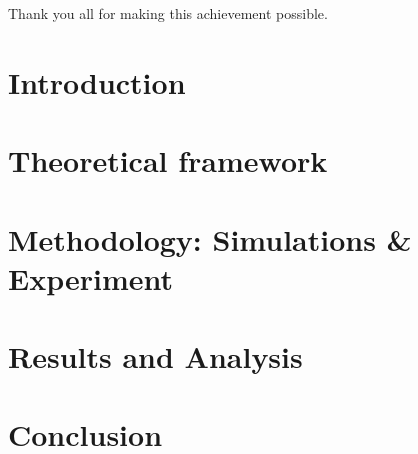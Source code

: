 \documentclass[a4paper,11pt]{report}
\begin{document}
Thank you all for making this achievement possible.

\newpage

\tableofcontents
\chapter{Introduction}


\chapter{Theoretical framework}


\chapter{Methodology: Simulations \& Experiment}


\chapter{Results and Analysis}


\chapter{Conclusion}


\nocite{*}
\printbibliography[heading=bibintoc]

\begin{appendix}

\end{appendix}
\end{document}
